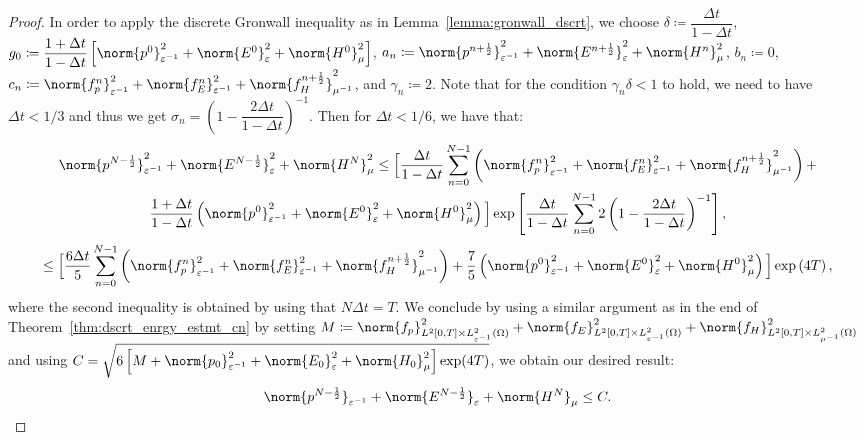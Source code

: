 \documentclass{amsart}
\theoremstyle{thmstyleone}%
\theoremstyle{thmstyletwo}%
\theoremstyle{thmstylethree}%
\begin{document}
\begin{proof}
In order to apply the discrete Gronwall inequality as in Lemma~\ref{lemma:gronwall_dscrt}, we choose $\delta \coloneq \dfrac{\Delta t}{1 - \Delta t}$, $g_0 \coloneq \dfrac{1 + \Delta t}{1 - \Delta t} \left[\norm{p^0}^2_{\varepsilon^{-1}} + \norm{E^0}^2_{\varepsilon} + \norm{H^0}^2_\mu \right]$, $a_n \coloneq \norm{p^{n+\frac{1}{2}}}^2_{\varepsilon^{-1}} + \norm{E^{n+\frac{1}{2}}}^2_{\varepsilon} + \norm{H^n}^2_\mu$, $b_n \coloneq 0$, $c_n \coloneq \norm{f_p^n}^2_{\varepsilon^{-1}} + \norm{f_E^n}^2_{\varepsilon^{-1}} + \norm{f_H^{n+\frac{1}{2}}}^2_{\mu^{-1}}$, and $\gamma_n \coloneq 2$. Note that for the condition $\gamma_n \delta < 1$ to hold, we need to have $\Delta t < 1/3$ and thus we get $\sigma_n = \left(1 - \dfrac{2 \Delta t}{1 - \Delta t} \right)^{-1}$. Then for $\Delta t < 1/6$, we have that:
\begin{multline*}
  \norm{p^{N - \frac{1}{2}}}^2_{\varepsilon^{-1}} + \norm{E^{N - \frac{1}{2}}}^2_{\varepsilon} + \norm{H^N}^2_{\mu} \le \Big[ \dfrac{\Delta t}{1 - \Delta t} \sum\limits_{n = 0}^{N - 1} \left( \norm{f_p^n}^2_{\varepsilon^{-1}} + \norm{f_E^n}^2_{\varepsilon^{-1}} + \norm{f_H^{n + \frac{1}{2}}}^2_{\mu^{-1}} \right) + \\
  \dfrac{1 + \Delta t}{1 - \Delta t} \left( \norm{p^0}^2_{\varepsilon^{-1}} + \norm{E^0}^2_{\varepsilon} + \norm{H^0}^2_\mu \right) \Big] \exp\left[ \dfrac{\Delta t}{1 - \Delta t} \sum\limits_{n = 0}^{N - 1} 2 \left(1 -  \dfrac{2 \Delta t}{1 - \Delta t}\right)^{-1} \right],
\end{multline*}
\vspace{-1em}
\[ 
  \le \Big[ \dfrac{6 \Delta t}{5} \sum\limits_{n = 0}^{N - 1} \left( \norm{f_p^n}^2_{\varepsilon^{-1}} + \norm{f_E^n}^2_{\varepsilon^{-1}} + \norm{f_H^{n + \frac{1}{2}}}^2_{\mu^{-1}} \right) +
  \dfrac{7}{5} \left( \norm{p^0}^2_{\varepsilon^{-1}} + \norm{E^0}^2_{\varepsilon} + \norm{H^0}^2_\mu \right) \Big] \exp\left( 4 T \right),
\]
where the second inequality is obtained by using that $N \Delta t = T$. We conclude by using a similar argument as in the end of Theorem~\ref{thm:dscrt_enrgy_estmt_cn} by setting $M \coloneq \norm{f_p}^2_{L^2[0, T] \times L^2_{\varepsilon^{-1}}(\Omega)} + \norm{f_E}^2_{L^2[0, T] \times L^2_{\varepsilon^{-1}}(\Omega)} + \norm{f_H}^2_{L^2[0, T] \times L^2_{\mu^{-1}}(\Omega)}$ and using $C = \sqrt{6 \left[ M +\norm{p_0}^2_{\varepsilon^{-1}} + \norm{E_0}^2_{\varepsilon} + \norm{H_0}^2_{\mu} \right] \exp(4T)}$, we obtain our desired result:
\[
  \norm{p^{N - \frac{1}{2}}}_{\varepsilon^{-1}} + \norm{E^{N - \frac{1}{2}}}_{\varepsilon} + \norm{H^N}_{\mu} \le C. \qedhere
\]
\end{proof}
\end{document}
